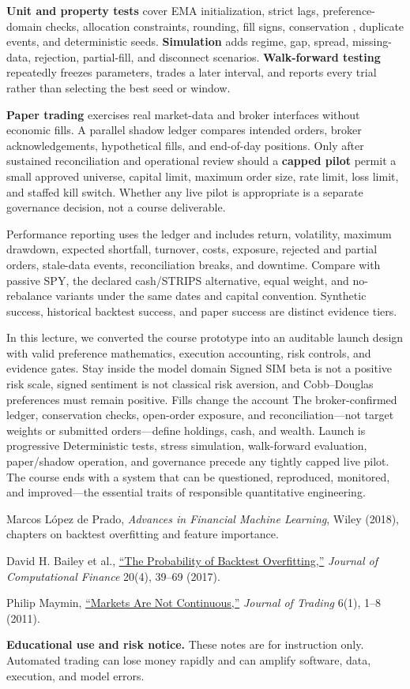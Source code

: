 \documentclass[11pt]{article}
\begin{document}
\textbf{Unit and property tests} cover EMA initialization, strict lags, preference-domain checks, allocation constraints, rounding, fill signs, conservation , duplicate events, and deterministic seeds. \textbf{Simulation} adds regime, gap, spread, missing-data, rejection, partial-fill, and disconnect scenarios. \textbf{Walk-forward testing} repeatedly freezes parameters, trades a later interval, and reports every trial rather than selecting the best seed or window.

\textbf{Paper trading} exercises real market-data and broker interfaces without economic fills. A parallel shadow ledger compares intended orders, broker acknowledgements, hypothetical fills, and end-of-day positions. Only after sustained reconciliation and operational review should a \textbf{capped pilot} permit a small approved universe, capital limit, maximum order size, rate limit, loss limit, and staffed kill switch. Whether any live pilot is appropriate is a separate governance decision, not a course deliverable.

Performance reporting uses the ledger and includes return, volatility, maximum drawdown, expected shortfall, turnover, costs, exposure, rejected and partial orders, stale-data events, reconciliation breaks, and downtime. Compare with passive SPY, the declared cash/STRIPS alternative, equal weight, and no-rebalance variants under the same dates and capital convention. Synthetic success, historical backtest success, and paper success are distinct evidence tiers.

\keytakeaways
  {In this lecture, we converted the course prototype into an auditable launch design with valid preference mathematics, execution accounting, risk controls, and evidence gates.}
  {Stay inside the model domain}
  {Signed SIM beta is not a positive risk scale, signed sentiment is not classical risk aversion, and Cobb--Douglas preferences must remain positive.}
  {Fills change the account}
  {The broker-confirmed ledger, conservation checks, open-order exposure, and reconciliation---not target weights or submitted orders---define holdings, cash, and wealth.}
  {Launch is progressive}
  {Deterministic tests, stress simulation, walk-forward evaluation, paper/shadow operation, and governance precede any tightly capped live pilot.}
  {The course ends with a system that can be questioned, reproduced, monitored, and improved---the essential traits of responsible quantitative engineering.}

\begin{readinglist}
  \item Marcos L\'opez de Prado, \emph{Advances in Financial Machine Learning}, Wiley (2018), chapters on backtest overfitting and feature importance.
  \item David H. Bailey et al., \href{https://doi.org/10.1093/rfs/hhu041}{``The Probability of Backtest Overfitting,''} \emph{Journal of Computational Finance} 20(4), 39--69 (2017).
  \item Philip Maymin, \href{https://doi.org/10.3905/jot.2011.6.1.001}{``Markets Are Not Continuous,''} \emph{Journal of Trading} 6(1), 1--8 (2011).
\end{readinglist}

{\sffamily\footnotesize\color{vnmuted}\textbf{Educational use and risk notice.} These notes are for instruction only. Automated trading can lose money rapidly and can amplify software, data, execution, and model errors.}
\end{document}
